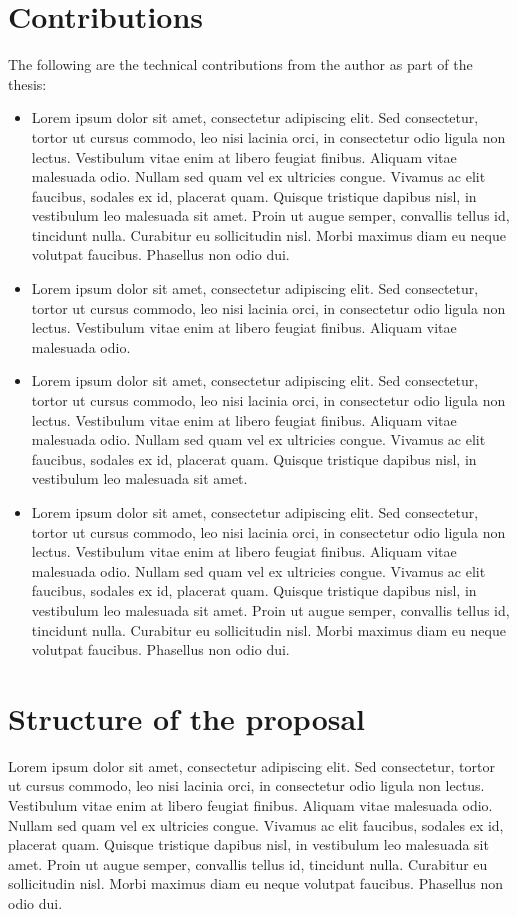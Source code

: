 \section{Contributions}
The following are the technical contributions from the author as part of the thesis:
\begin{itemize}
    \item Lorem ipsum dolor sit amet, consectetur adipiscing elit. Sed consectetur, tortor ut cursus commodo, leo nisi lacinia orci, in consectetur odio ligula non lectus. Vestibulum vitae enim at libero feugiat finibus. Aliquam vitae malesuada odio. Nullam sed quam vel ex ultricies congue. Vivamus ac elit faucibus, sodales ex id, placerat quam. Quisque tristique dapibus nisl, in vestibulum leo malesuada sit amet. Proin ut augue semper, convallis tellus id, tincidunt nulla. Curabitur eu sollicitudin nisl. Morbi maximus diam eu neque volutpat faucibus. Phasellus non odio dui.
    \item Lorem ipsum dolor sit amet, consectetur adipiscing elit. Sed consectetur, tortor ut cursus commodo, leo nisi lacinia orci, in consectetur odio ligula non lectus. Vestibulum vitae enim at libero feugiat finibus. Aliquam vitae malesuada odio.
    \item Lorem ipsum dolor sit amet, consectetur adipiscing elit. Sed consectetur, tortor ut cursus commodo, leo nisi lacinia orci, in consectetur odio ligula non lectus. Vestibulum vitae enim at libero feugiat finibus. Aliquam vitae malesuada odio. Nullam sed quam vel ex ultricies congue. Vivamus ac elit faucibus, sodales ex id, placerat quam. Quisque tristique dapibus nisl, in vestibulum leo malesuada sit amet.
    \item Lorem ipsum dolor sit amet, consectetur adipiscing elit. Sed consectetur, tortor ut cursus commodo, leo nisi lacinia orci, in consectetur odio ligula non lectus. Vestibulum vitae enim at libero feugiat finibus. Aliquam vitae malesuada odio. Nullam sed quam vel ex ultricies congue. Vivamus ac elit faucibus, sodales ex id, placerat quam. Quisque tristique dapibus nisl, in vestibulum leo malesuada sit amet. Proin ut augue semper, convallis tellus id, tincidunt nulla. Curabitur eu sollicitudin nisl. Morbi maximus diam eu neque volutpat faucibus. Phasellus non odio dui.  
\end{itemize}

\section{Structure of the proposal}
Lorem ipsum dolor sit amet, consectetur adipiscing elit. Sed consectetur, tortor ut cursus commodo, leo nisi lacinia orci, in consectetur odio ligula non lectus. Vestibulum vitae enim at libero feugiat finibus. Aliquam vitae malesuada odio. Nullam sed quam vel ex ultricies congue. Vivamus ac elit faucibus, sodales ex id, placerat quam. Quisque tristique dapibus nisl, in vestibulum leo malesuada sit amet. Proin ut augue semper, convallis tellus id, tincidunt nulla. Curabitur eu sollicitudin nisl. Morbi maximus diam eu neque volutpat faucibus. Phasellus non odio dui.

